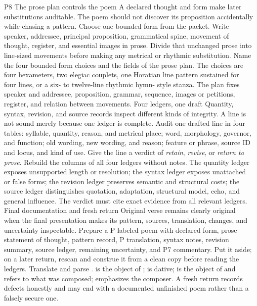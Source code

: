 \begin{courseunit}{P8}
\SubmoduleExtension
  {The prose plan controls the poem}
  {A declared thought and form make later substitutions auditable. The poem
  should not discover its proposition accidentally while chasing a pattern.}
  {Choose one bounded form from the packet. Write speaker, addressee, principal
  proposition, grammatical spine, movement of thought, register, and essential
  images in prose. Divide that unchanged prose into line-sized movements before
  making any metrical or rhythmic substitution.}
  {Name the four bounded form choices and the fields of the prose plan.}
  {The choices are four hexameters, two elegiac couplets, one Horatian line
  pattern sustained for four lines, or a six- to twelve-line rhythmic hymn-
  style stanza. The plan fixes speaker and addressee, proposition, grammar,
  sequence, images or petitions, register, and relation between movements.}
\SubmoduleExtension
  {Four ledgers, one draft}
  {Quantity, syntax, revision, and source records inspect different kinds of
  integrity. A line is not sound merely because one ledger is complete.}
  {Audit one drafted line in four tables: syllable, quantity, reason, and
  metrical place; word, morphology, governor, and function; old wording, new
  wording, and reason; feature or phrase, source ID and locus, and kind of use.
  Give the line a verdict of \emph{retain}, \emph{revise}, or \emph{return to
  prose}.}
  {Rebuild the columns of all four ledgers without notes.}
  {The quantity ledger exposes unsupported length or resolution; the syntax
  ledger exposes unattached or false forms; the revision ledger preserves
  semantic and structural costs; the source ledger distinguishes quotation,
  adaptation, structural model, echo, and general influence. The verdict must
  cite exact evidence from all relevant ledgers.}
\SubmoduleExtension
  {Final documentation and fresh return}
  {Original verse remains clearly original when the final presentation makes
  its pattern, sources, translation, changes, and uncertainty inspectable.}
  {Prepare a P-labeled poem with declared form, prose statement of thought,
  pattern record, P translation, syntax notes, revision summary, source
  ledger, remaining uncertainty, and P7 commentary. Put it aside; on a later
  return, rescan and construe it from a clean copy before reading the ledgers.}
  {Translate and parse .}
  {
   is the object of ;  is
  dative;  is the object of  and refers to what
  was composed;  emphasizes the composer. A fresh return records
  defects honestly and may end with a documented unfinished poem rather than
  a falsely secure one.}
\end{courseunit}
